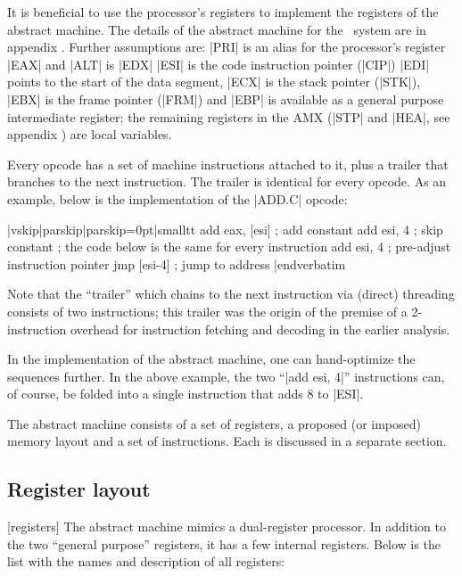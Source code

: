 It is beneficial to use the processor's registers to implement the registers of
the abstract machine. The details of the abstract machine for the \Small\ system
are in appendix . Further assumptions are:
\beginlist{1em}\compactlist
\list{\lbullet} |PRI| is an alias for the processor's register |EAX| and
  |ALT| is |EDX|
\list{\lbullet} |ESI| is the code instruction pointer (|CIP|)
\list{\lbullet} |EDI| points to the start of the data segment, |ECX| is the
  stack pointer (|STK|), |EBX| is the frame pointer (|FRM|) and
  |EBP| is available as a general purpose intermediate register; the remaining
  registers in the AMX (|STP| and |HEA|, see appendix ) are local variables.
\endlist

Every opcode has a set of machine instructions attached to it, plus a trailer
that branches to the next instruction. The trailer is identical for every
opcode. As an example, below is the implementation of the |ADD.C| opcode:

\verbatim|vskip|parskip|parskip=0pt|smalltt
        add     eax, [esi]      ; add constant
        add     esi, 4          ; skip constant
        ; the code below is the same for every instruction
        add     esi, 4          ; pre-adjust instruction pointer
        jmp     [esi-4]         ; jump to address
|endverbatim

Note that the ``trailer'' which chains to the next instruction via (direct)
threading consists of two instructions; this trailer was the origin of the
premise of a 2-instruction overhead for instruction fetching and decoding in
the earlier analysis.

In the implementation of the abstract machine, one can hand-optimize
the sequences further. In the above example, the two ``|add esi, 4|''
instructions can, of course, be folded into a single instruction that adds
8 to |ESI|.


The abstract machine consists of a set of registers, a proposed (or imposed)
memory layout and a set of instructions. Each is discussed in a separate
section.

\subsection{Register layout}
[registers]
The abstract machine mimics a dual-register processor. In addition to the
two ``general purpose'' registers, it has a few internal registers. Below is
the list with the names and description of all registers:

